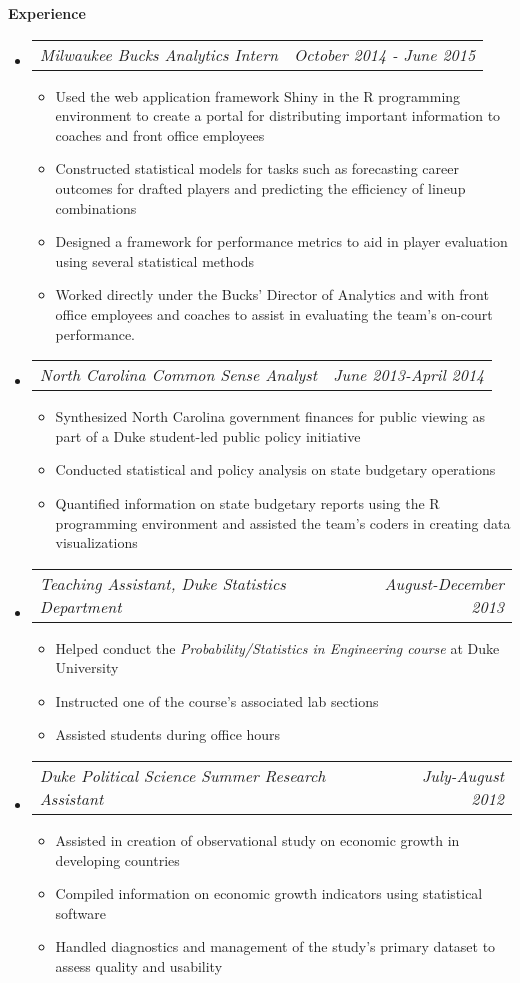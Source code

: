 \documentclass[letterpaper,11pt]{article}
\makeatletter
\newcommand{\resitem}[1]{\item #1 \vspace{-2pt}}
\newcommand{\resheading}[1]{{\large \colorbox{mygrey}{\begin{minipage}{\textwidth}{\textbf{#1 \vphantom{p\^{E}}}}\end{minipage}}}}
\newcommand{\ressubsubheading}[2]{
\begin{tabular*}{6.5in}{l@{\extracolsep{\fill}}r}
		\textit{#1} & \textit{#2} \\
\end{tabular*}\vspace{-6pt}}
\makeatother
\begin{document}
\resheading{Experience}
	\begin{itemize}
		\item 
			\ressubsubheading{Milwaukee Bucks Analytics Intern}{October 2014 - June 2015}
				{ \footnotesize
				\begin{itemize}
					\resitem{Used the web application framework Shiny in the R programming environment to create a portal for distributing
important information to coaches and front office employees}
					\resitem{Constructed statistical models for tasks such as forecasting career outcomes for drafted players and predicting the
efficiency of lineup combinations}
					\resitem{Designed a framework for performance metrics to aid in player evaluation using several statistical methods}
					\resitem{Worked directly under the Bucks' Director of Analytics and with front office employees and coaches to assist in evaluating
the team's on-court performance.}
				\end{itemize}
				}
		\item 
			\ressubsubheading{North Carolina Common Sense Analyst}{June 2013-April 2014}
				{ \footnotesize
				\begin{itemize}
					\resitem{Synthesized North Carolina government finances for public viewing as part of a Duke student-led public policy initiative}
					\resitem{Conducted statistical and policy analysis on state budgetary operations}
					\resitem{Quantified information on state budgetary reports using the R programming environment and assisted the team's
coders in creating data visualizations}
				\end{itemize}
				}
					\item 
			\ressubsubheading{Teaching Assistant, Duke Statistics Department}{August-December 2013}
				{ \footnotesize
				\begin{itemize}
					\resitem{Helped conduct the \textit{Probability/Statistics in Engineering course} at Duke University}
					\resitem{Instructed one of the course's associated lab sections}
					\resitem{Assisted students during office hours}
				\end{itemize}
				}
					\item 
			\ressubsubheading{Duke Political Science Summer Research Assistant}{July-August 2012}
				{ \footnotesize
				\begin{itemize}
					\resitem{Assisted in creation of observational study on economic growth in developing countries}
					\resitem{Compiled information on economic growth indicators using statistical software}
					\resitem{Handled diagnostics and management of the study's primary dataset to assess quality and usability}
				\end{itemize}
				}

	\end{itemize}  %
\end{document}
